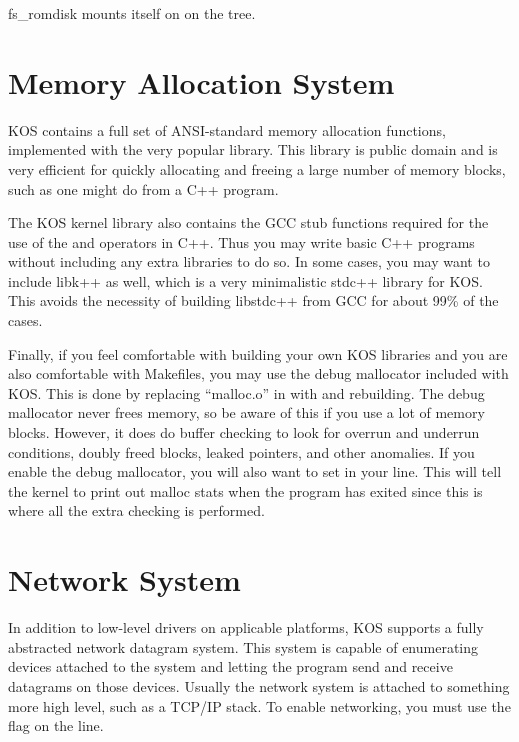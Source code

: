 \documentclass[english]{report}
\begin{document}
fs\_romdisk mounts itself on  on the tree.


\section{Memory Allocation System}

KOS contains a full set of ANSI-standard memory allocation functions,
implemented with the very popular  library. This library
is public domain and is very efficient for quickly allocating and
freeing a large number of memory blocks, such as one might do from
a C++ program.

The KOS kernel library also contains the GCC stub functions required
for the use of the  and  operators in C++.
Thus you may write basic C++ programs without including any extra
libraries to do so. In some cases, you may want to include libk++
as well, which is a very minimalistic stdc++ library for KOS. This
avoids the necessity of building libstdc++ from GCC for about 99\%
of the cases.

Finally, if you feel comfortable with building your own KOS libraries
and you are also comfortable with Makefiles, you may use the debug
mallocator included with KOS. This is done by replacing ``malloc.o''
in  with  and rebuilding.
The debug mallocator never frees memory, so be aware of this if you
use a lot of memory blocks. However, it does do buffer checking to
look for overrun and underrun conditions, doubly freed blocks, leaked
pointers, and other anomalies. If you enable the debug mallocator,
you will also want to set  in your 
line. This will tell the kernel to print out malloc stats when the
program has exited since this is where all the extra checking is performed.


\section{Network System}

In addition to low-level drivers on applicable platforms, KOS supports
a fully abstracted network datagram system. This system is capable
of enumerating devices attached to the system and letting the program
send and receive datagrams on those devices. Usually the network system
is attached to something more high level, such as a TCP/IP stack.
To enable networking, you must use the  flag on the
 line.
\end{document}
